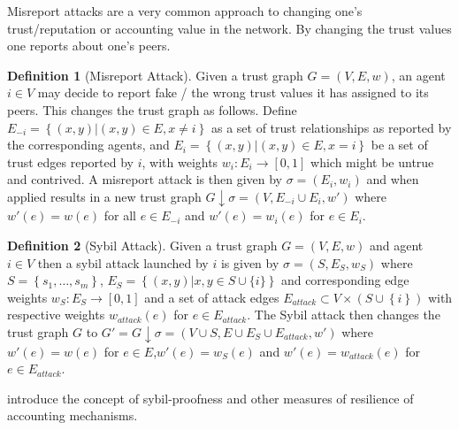 \documentclass[11pt,a4paper]{article}
\theoremstyle{definition}
\newtheorem{definition}{Definition}[section]
\theoremstyle{theorem}
\theoremstyle{proposition}
\theoremstyle{corollary}
\theoremstyle{lemma}
\theoremstyle{example}
\theoremstyle{remark}
\begin{document}
\noindent{}Misreport attacks are a very common approach to changing one's trust/reputation or accounting value in the network. By changing the trust values one reports about one's peers.  
\begin{definition}[Misreport Attack]
Given a trust graph $G=(V,E,w)$, an agent $i\in{}V$ may decide to report fake / the wrong trust values it has assigned to its peers. This changes the trust graph as follows. Define $E_{-i}=\left\lbrace{}(x,y)|(x,y)\in{}E, x\neq{}i\right\rbrace$ as a set of trust relationships as reported by the corresponding agents, and $E_i=\left\lbrace{}(x,y)|(x,y)\in{}E,x=i\right\rbrace$ be a set of trust edges reported by $i$, with weights $w_i:E_i\rightarrow{}[0,1]$ which might be untrue and contrived. A misreport attack is then given by $\sigma=(E_i,w_i)$ and when applied results in a new trust graph $G\downarrow\sigma=(V,E_{-i}\cup{}E_{i},w')$ where $w'(e)=w(e)$ for all $e\in{}E_{-i}$ and $w'(e)=w_i(e)$ for $e\in{}E_{i}$. \vspace{1em}\\
\end{definition}

\begin{definition}[Sybil Attack]
Given a trust graph $G=(V,E,w)$ and agent $i\in{}V$ then a sybil attack launched by $i$ is given by $\sigma=(S,E_S,w_S)$ where $S=\left\lbrace{}s_1,\ldots,s_m\right\rbrace$, $E_S=\left\lbrace{}(x,y)|x,y\in{}S\cup\{i\}\right\rbrace$ and corresponding edge weights $w_S:E_S\rightarrow{}[0,1]$ and a set of attack edges $E_{attack}\subset{}V\times{}(S\cup{}\left\lbrace{}i\right\rbrace)$ with respective weights $w_{attack}(e)$ for $e\in{}E_{attack}$. The Sybil attack then changes the trust graph $G$ to $G' = G\downarrow\sigma = (V\cup{}S,E\cup{}E_S\cup{}E_{attack},w')$ where $w'(e)=w(e)$ for $e\in{}E$,$w'(e)=w_S(e)$ and $w'(e)=w_{attack}(e)$ for $e\in{}E_{attack}$.
\end{definition}
\noindent{}\cite{Work Accounting Mechanisms: Theory and Practice} introduce the concept of sybil-proofness and other measures of resilience of accounting mechanisms. \vspace{1em}\\
\end{document}
